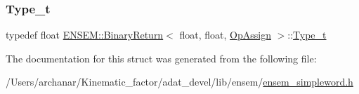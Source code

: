\mbox{\label{structENSEM_1_1BinaryReturn_3_01float_00_01float_00_01OpAssign_01_4_a65f1032b48415f3cc75ef4be460c1b06}} 
\subsubsection{\texorpdfstring{Type\_t}{Type\_t}\hspace{0.1cm}{\footnotesize\ttfamily [2/2]}}
{\footnotesize\ttfamily typedef float \mbox{\hyperlink{structENSEM_1_1BinaryReturn}{E\+N\+S\+E\+M\+::\+Binary\+Return}}$<$ float, float, \mbox{\hyperlink{structENSEM_1_1OpAssign}{Op\+Assign}} $>$\+::\mbox{\hyperlink{structENSEM_1_1BinaryReturn_3_01float_00_01float_00_01OpAssign_01_4_a65f1032b48415f3cc75ef4be460c1b06}{Type\+\_\+t}}}



The documentation for this struct was generated from the following file\+:\begin{DoxyCompactItemize}
\item 
/\+Users/archanar/\+Kinematic\+\_\+factor/adat\+\_\+devel/lib/ensem/\mbox{\hyperlink{lib_2ensem_2ensem__simpleword_8h}{ensem\+\_\+simpleword.\+h}}\end{DoxyCompactItemize}
